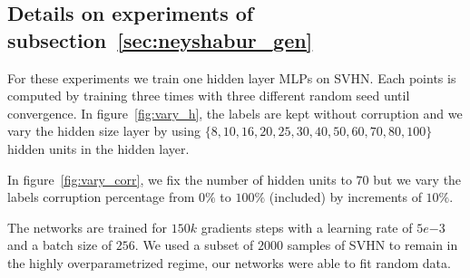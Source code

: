 \subsection{Details on experiments of subsection~\ref{sec:neyshabur_gen}}
For these experiments we train one hidden layer MLPs on SVHN. Each points is computed by training three times with three different random seed until convergence.
In figure~\ref{fig:vary_h}, the labels are kept without corruption and we vary the hidden size layer by using $\{8, 10, 16, 20, 25, 30, 40, 50, 60, 70, 80, 100\}$ hidden units in the hidden layer.

In figure~\ref{fig:vary_corr}, we fix the number of hidden units to $70$ but we vary the labels corruption percentage from $0\%$ to $100\%$ (included) by increments of $10\%$.

The networks are trained for $150k$ gradients steps with a learning rate of $5e{-3}$ and a batch size of $256$.
We used a subset of $2000$ samples of SVHN to remain in the highly overparametrized regime, our networks were able to fit random data.


